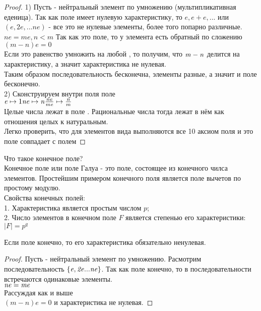 \begin{proof}
	1) Пусть  - нейтральный элемент по умножению (мультипликативная еденица).
	Так как поле имеет нулевую характеристику, то $\mathit {e, e+e, ...}$ или
	$\mathit {(e, 2e, ... ne)}$ - все это не нулевые элементы, более того попарно
	различные.\\
	$\mathit {ne = me, n < m}$ Так как это поле, то у элемента  есть
	обратный по сложению $\mathit {(m-n)e=0}$ \\
	Если это равенство умножить на любой , то получим, что $\mathit {m-n}$ делится на
	характеристику, а значит характеристика не нулевая.\\
	Таким образом последовательность бесконечна, элементы разные, а значит и поле
	бесконечно.\\
	2) Сконструируем внутри поля  поле  \\
	$\mathit {e} \mapsto 1 \\
	\mathit {ne} \mapsto \mathit {n} \\
	\frac{ne}{me} \mapsto \frac{n}{m}$ \\

           Целые числа лежат в поле . Рациональные числа тогда лежат в нём
           как отношения целых к натуральным.\\

	Легко проверить, что для элементов вида  выполняются все 10 аксиом
	поля и это поле совпадает с полем 
	\end{proof}

           Что такое конечное поле?\\
           Конечное поле или поле Галуа - это поле, состоящее из конечного чилса элементов.
           Простейшим примером конечного поля является поле вычетов по простому модулю.\\

           Свойства конечных полей:\\
             1. Характеристика является простым числом $p$;\\
             2. Число элементов в конечном поле $F$ является степенью его характеристики: $|F| = p^{q}$\\

\begin{theorem}
	Если поле конечно, то его характеристика обязательно ненулевая.
\end{theorem}

\begin{proof}
	Пусть  - нейтральный элемент по умножению. Расмотрим последовательность
	$\mathit {\{e,2e...ne\}}$. Так как поле конечно, то в последовательности
	встречаются одинаковые элементы.\\
	$\mathit{ne=me}$ \\
	Рассуждая как и выше \\
	$\mathit {(m-n)e=0}$ и характеристика не нулевая.
\end{proof}

